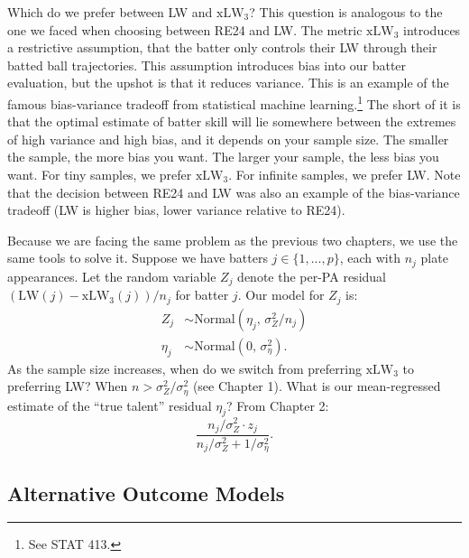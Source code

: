 \documentclass{article}
\begin{document}
    Which do we prefer between LW and $\mbox{xLW}_3$? This question is analogous to the one we faced when choosing between RE24 and LW. The metric $\mbox{xLW}_3$ introduces a restrictive assumption, that the batter only controls their LW through their batted ball trajectories. This assumption introduces bias into our batter evaluation, but the upshot is that it reduces variance. This is an example of the famous bias-variance tradeoff from statistical machine learning.\footnote{See STAT 413.} The short of it is that the optimal estimate of batter skill will lie somewhere between the extremes of high variance and high bias, and it depends on your sample size. The smaller the sample, the more bias you want. The larger your sample, the less bias you want. For tiny samples, we prefer $\mbox{xLW}_3$. For infinite samples, we prefer LW. Note that the decision between RE24 and LW was also an example of the bias-variance tradeoff (LW is higher bias, lower variance relative to RE24).
    
    Because we are facing the same problem as the previous two chapters, we use the same tools to solve it. Suppose we have batters $j \in \{1, ..., p\}$, each with $n_j$ plate appearances. Let the random variable $Z_j$ denote the per-PA residual $(\mbox{LW}(j) - \mbox{xLW}_3(j)) / n_j$ for batter $j$. Our model for $Z_j$ is:
    \begin{align*}
      Z_j &\sim \mbox{Normal}(\eta_j,\, \sigma^2_Z / n_j)\\
      \eta_j &\sim \mbox{Normal}(0,\, \sigma^2_\eta).
    \end{align*}
    As the sample size increases, when do we switch from preferring $\mbox{xLW}_3$ to preferring LW? When $n > \sigma^2_Z / \sigma^2_\eta$ (see Chapter 1). What is our mean-regressed estimate of the ``true talent'' residual $\eta_j$? From Chapter 2:
    \begin{equation*}
      \frac{n_j / \sigma^2_Z \cdot z_j}{n_j / \sigma^2_Z + 1 / \sigma^2_\eta}.
    \end{equation*}

  \subsection{\sc Alternative Outcome Models}
\end{document}
